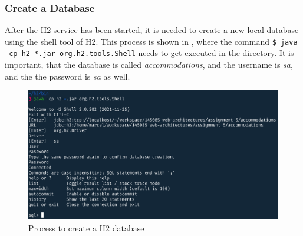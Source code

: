 \subsubsection{Create a Database}\label{sec:03_depl_h2_create}
After the H2 service has been started, it is needed to create a new local database using the shell tool of H2. This process is shown in , where the command \texttt{\$ java -cp h2-*.jar org.h2.tools.Shell} needs to get executed in the  directory. It is important, that the database is called \textit{accommodations}, and the username is \textit{sa}, and the the password is \textit{sa} as well.
\begin{figure}[h]
\centering
\includegraphics[scale=0.18]{images/03_depl/create-db}
\caption{Process to create a H2 database}
\label{fig:03_depl_createdb_create}
\end{figure}

